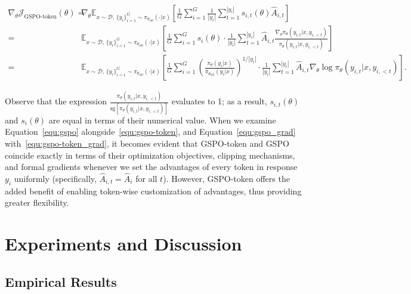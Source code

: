 \begin{align}
\nabla_{\theta} \mathcal{J}_\text{GSPO-token}(\theta)
=&\ 
\nabla_{\theta} \mathbb{E}_{ x \sim \mathcal{D},\, \{y_i\}_{i=1}^G \sim \pi_{\theta_\text{old}}( \cdot | x) }
\left[
\frac{1}{G} \sum_{i=1}^{G}
\frac{1}{|y_i|} \sum_{t=1}^{|y_i|}
s_{i,t}(\theta) \widehat{A}_{i,t}
\right] \\
=&\
\mathbb{E}_{ x \sim \mathcal{D},\, \{y_i\}_{i=1}^G \sim \pi_{\theta_\text{old}}( \cdot | x) }
\left[
\frac{1}{G} \sum_{i=1}^{G} s_i (\theta) \cdot \frac{1}{|y_i|} \sum_{t=1}^{|y_i|}
\widehat{A}_{i,t} \frac{\nabla_{\theta} \pi_{\theta} (y_{i,t} | x, y_{i,<t}) }{\pi_{\theta} (y_{i,t} | x, y_{i,<t})}
\right] \\
=&\
\mathbb{E}_{ x \sim \mathcal{D},\, \{y_i\}_{i=1}^G \sim \pi_{\theta_\text{old}}( \cdot | x) }
\left[
\frac{1}{G} \sum_{i=1}^{G} \left( \frac{ \pi_{\theta} (y_i | x) }{ \pi_{\theta_\text{old}} (y_i | x)} \right)^{1 / |y_i|}
\cdot \frac{1}{|y_i|} \sum_{t=1}^{|y_i|}
\widehat{A}_{i,t} \nabla_{\theta} \log \pi_{\theta} (y_{i,t} | x, y_{i,<t})
\right].
\label{equ:gspo-token_grad}
\end{align}

Observe that the expression $\frac{ \pi_{\theta} (y_{i,t} | x, y_{i,<t}) }{ \mathrm{sg} \left[ \pi_{\theta} (y_{i,t} | x, y_{i,<t}) \right] }$ evaluates to 1; as a result, $s_{i,t}(\theta)$ and $s_{i}(\theta)$ are equal in terms of their numerical value.
When we examine Equation~\eqref{equ:gspo} alongside~\eqref{equ:gspo-token}, and Equation~\eqref{equ:gspo_grad} with~\eqref{equ:gspo-token_grad}, it becomes evident that GSPO-token and GSPO coincide exactly in terms of their optimization objectives, clipping mechanisms, and formal gradients whenever we set the advantages of every token in response $y_i$ uniformly (specifically, $\widehat{A}_{i,t} = \widehat{A}_{i}$ for all $t$). However, GSPO-token offers the added benefit of enabling token-wise customization of advantages, thus providing greater flexibility.

\section{Experiments and Discussion}

\subsection{Empirical Results}

